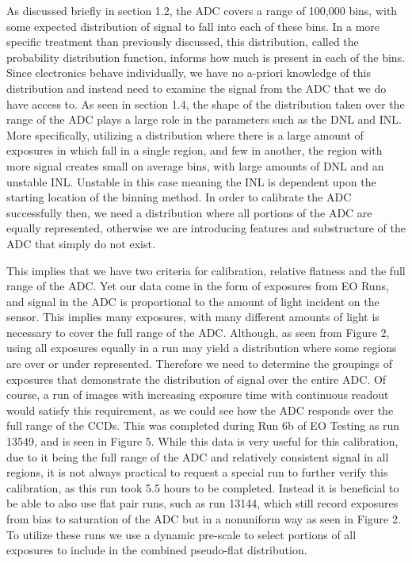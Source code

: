 \documentclass[11pt, letterpaper]{article}
\begin{document}
As discussed briefly in section 1.2, the ADC covers a range of 100,000 bins, with some expected distribution of signal to fall into each of these bins. 
In a more specific treatment than previously discussed, this distribution, called the probability distribution function, informs how much is present in each of the bins. 
Since electronics behave individually, we have no a-priori knowledge of this distribution and instead need to examine the signal from the ADC that we do have access to. 
As seen in section 1.4, the shape of the distribution taken over the range of the ADC plays a large role in the parameters such as the DNL and INL.
More specifically, utilizing a distribution where there is a large amount of exposures in which fall in a single region, and few in another, the region with more signal creates small on average bins, with large amounts of DNL and an unstable INL. 
Unstable in this case meaning the INL is dependent upon the starting location of the binning method.
In order to calibrate the ADC successfully then, we need a distribution where all portions of the ADC are equally represented, otherwise we are introducing features and substructure of the ADC that simply do not exist. 
\indent 


This implies that we have two criteria for calibration, relative flatness and the full range of the ADC. 
Yet our data come in the form of exposures from EO Runs, and signal in the ADC is proportional to the amount of light incident on the sensor. 
This implies many exposures, with many different amounts of light is necessary to cover the full range of the ADC. 
Although, as seen from Figure 2, using all exposures equally in a run may yield a distribution where some regions are over or under represented. 
Therefore we need to determine the groupings of exposures that demonstrate the distribution of signal over the entire ADC. 
Of course, a run of images with increasing exposure time with continuous readout would satisfy this requirement, as we could see how the ADC responds over the full range of the CCDs. 
This was completed during Run 6b of EO Testing as run 13549, and is seen in Figure 5.
While this data is very useful for this calibration, due to it being the full range of the ADC and relatively consistent signal in all regions, it is not always practical to request a special run to further verify this calibration, as this run took 5.5 hours to be completed.
Instead it is beneficial to be able to also use flat pair runs, such as run 13144, which still record exposures from bias to saturation of the ADC but in a nonuniform way as seen in Figure 2.
To utilize these runs we use a dynamic pre-scale to select portions of all exposures to include in the combined pseudo-flat distribution. 
\end{document}
